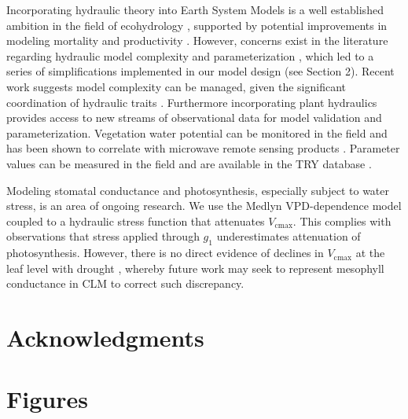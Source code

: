 \documentclass[draft,linenumbers]{agujournal}
\begin{document}
  Incorporating hydraulic theory into Earth System Models is a well established ambition in the field of ecohydrology \citep{sperry2015}, supported by potential improvements in modeling mortality and productivity \citep{choat2012,mcdowell2018}.
    However, concerns exist in the literature regarding hydraulic model complexity and parameterization \citep{verhoef2014,drake2017}, 
    which led to a series of simplifications implemented in our model design (see Section 2).
    Recent work suggests model complexity can be managed, given the significant coordination of hydraulic traits \citep{bartlett2016,christoffersen2016}.
    Furthermore incorporating plant hydraulics provides access to new streams of observational data for model validation and parameterization.
    Vegetation water potential can be monitored in the field \citep{boyer1967} and has been shown to correlate with microwave remote sensing products \citep{momen2017}.
    Parameter values can be measured in the field \citep{sack2002} and are available in the TRY database \citep{kattge2011}.

Modeling stomatal conductance and photosynthesis, especially subject to water stress, is an area of ongoing research. We use the Medlyn VPD-dependence model coupled to a hydraulic stress function that attenuates $V_{\text{cmax}}$. This complies with observations \citep{lin2018,zhou2013} that stress applied through $g_1$ underestimates attenuation of photosynthesis. However, there is no direct evidence of declines in $V_{\text{cmax}}$ at the leaf level with drought \citep{flexas2006}, whereby future work may seek to represent mesophyll conductance in CLM to correct such discrepancy.
    
\section{Acknowledgments}

\clearpage    

\section{Figures}
\end{document}
